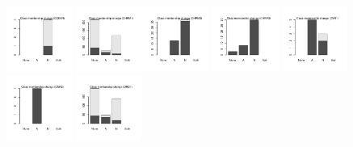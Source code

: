 \documentclass[10pt,article]{memoir}
\begin{document}
\begin{figure}[h!]
\includegraphics[width=0.19\textwidth]{figures/validation_plots/cckar_0p8_valplot.pdf}
\includegraphics[width=0.19\textwidth]{figures/validation_plots/chrm1_0p8_valplot.pdf}
\includegraphics[width=0.19\textwidth]{figures/validation_plots/chrm2_0p8_valplot.pdf}
\includegraphics[width=0.19\textwidth]{figures/validation_plots/chrm3_0p8_valplot.pdf}
\includegraphics[width=0.19\textwidth]{figures/validation_plots/cnr1_0p8_valplot.pdf}
\includegraphics[width=0.19\textwidth]{figures/validation_plots/cnr2_0p8_valplot.pdf}
\includegraphics[width=0.19\textwidth]{figures/validation_plots/drd1_0p8_valplot.pdf}

\end{figure}
\end{document}
